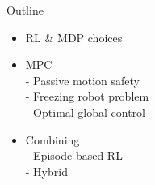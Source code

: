 \documentclass[navbaroff]{sdqbeamer}
\begin{document}
\begin{frame}{Outline}
    \begin{itemize}
        \item RL \& MDP choices
        \item MPC\\
            - Passive motion safety\\
            - Freezing robot problem\\
            - Optimal global control
        \item Combining\\
            - Episode-based RL\\
            - Hybrid
    \end{itemize}

\end{frame}
\end{document}
